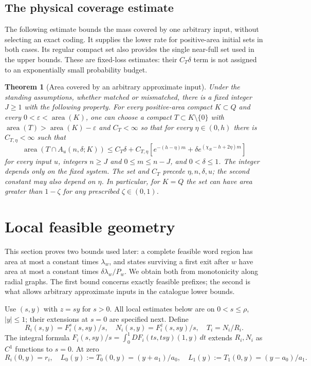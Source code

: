 \documentclass[11pt]{amsart}
\newtheorem{theorem}{Theorem}[section]
\theoremstyle{definition}
\theoremstyle{remark}
\newcommand{\area}{\operatorname{area}}
\numberwithin{equation}{section}
\begin{document}
\subsection{The physical coverage estimate}
The following estimate bounds the mass covered by one arbitrary input,
without selecting an exact coding. It supplies the lower rate for
positive-area initial sets in both cases. Its regular compact set
also provides the single near-full set used in the upper bounds.
These are fixed-loss estimates: their $C_T\delta$ term is not
assigned to an exponentially small probability budget.

\begin{theorem}[Area covered by an arbitrary approximate input]\label{thm:area}
Under the standing assumptions, whether matched or mismatched,
there is a fixed integer $J\ge1$ with
the following property. For every positive-area compact $K\subset Q$
and every $0<\varepsilon<\area(K)$,
one can choose a compact $T\subset K\setminus\{0\}$ with
$\area(T)>\area(K)-\varepsilon$ and $C_T<\infty$
so that for every $\eta\in(0,h)$ there is $C_{T,\eta}<\infty$
such that
\begin{equation}\label{eq:actualarea}
\area(T\cap A_u(n,\delta;K))\le C_T\delta+
C_{T,\eta}\left[e^{-(h-\eta)m}+\delta e^{(\chi_R-h+2\eta)m}\right]
\end{equation}
for every input $u$, integers $n\ge J$ and $0\le m\le n-J$,
and $0<\delta\le1$.
The integer depends only on the fixed system. The set and $C_T$
precede $\eta,n,\delta,u$; the second constant may also depend on $\eta$.
In particular, for $K=Q$ the set can have area greater than
$1-\zeta$ for any prescribed $\zeta\in(0,1)$.
\end{theorem}

\section{Local feasible geometry}\label{sec:geometry}
This section proves two bounds used later: a complete feasible
word region has area at most a constant times $\lambda_w$, and
states surviving a first exit after $w$ have area at most a constant
times $\delta\lambda_w/P_w$. We obtain both from monotonicity
along radial graphs. The first bound concerns exactly feasible
prefixes; the second is what allows arbitrary approximate inputs
in the catalogue lower bounds.

Use \((s,y)\) with \(z=sy\) for \(s>0\). All local estimates
below are on \(0<s\le\rho\), \(|y|\le1\); their extensions
at \(s=0\) are specified next. Define
\[
 R_i(s,y)=F_i^s(s,sy)/s,\quad
 N_i(s,y)=F_i^z(s,sy)/s,\quad T_i=N_i/R_i.
\]
The integral formula
\(F_i(s,sy)/s=\int_0^1DF_i(ts,tsy)(1,y)\,dt\)
extends \(R_i,N_i\) as \(C^1\) functions to \(s=0\).
At zero
\begin{equation}
R_i(0,y)=r_i,\quad
 L_0(y):=T_0(0,y)=(y+a_1)/a_0,\quad
 L_1(y):=T_1(0,y)=(y-a_0)/a_1.                                \label{eq:limangular}
\end{equation}
\end{document}
